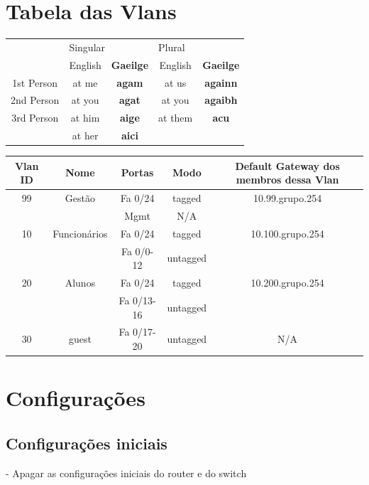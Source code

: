 \documentclass[a4paper,titlepage]{article}
\begin{document}
	\section{Tabela das Vlans}
	
		\begin{tabular}{|c||c|c||c|c|}
		\hline &\multicolumn{2}{l|}{Singular}&\multicolumn{2}{l|}{Plural}\\
		\cline{2-5}
		 &English&\textbf{Gaeilge}&English&\textbf{Gaeilge}\\
		\hline\hline
		1st Person&at me&\textbf{agam}&at us&\textbf{againn}\\
		2nd Person&at you&\textbf{agat}&at you&\textbf{agaibh}\\
		3rd Person&at him&\textbf{aige}&at them&\textbf{acu}\\
		 &at her&\textbf{aici}& & \\
		\hline
		\end{tabular}
	
		\begin{tabular}{|c|c|c|c|c|}
			\hline Vlan ID & Nome & Portas & Modo & Default Gateway dos membros dessa Vlan\\
			\hline
			99 & Gestão & Fa 0/24 & tagged & 10.99.grupo.254\\ 
			\cline{3-4} && Mgmt & N/A &\\ \hline
			10 & Funcionários & Fa 0/24 & tagged & 10.100.grupo.254\\ 
			\cline{3-4} && Fa 0/0-12 & untagged &\\ \hline
			20 & Alunos & Fa 0/24 & tagged & 10.200.grupo.254\\ 
			\cline{3-4} && Fa 0/13-16 & untagged &\\ \hline
			30 & guest & Fa 0/17-20 & untagged & N/A\\
			\hline
			\end{tabular}
	\section{Configurações}
		\subsection{Configurações iniciais}
			- Apagar as configurações iniciais do router e do switch\\
			
\end{document}
